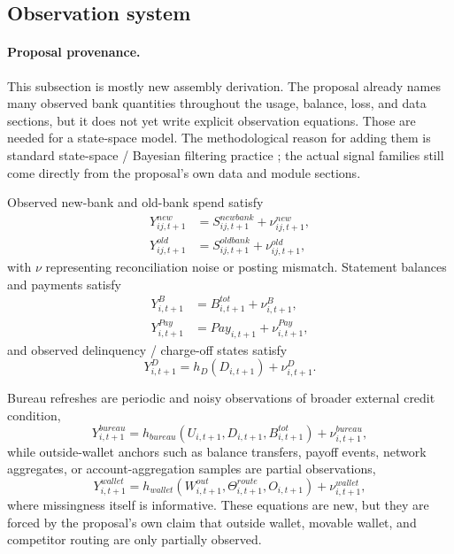 \documentclass[11pt]{article}
\newcommand{\1}{\mathbf{1}}
\begin{document}
\subsection{Observation system}
\label{subsec:state-space-observations}

\paragraph{Proposal provenance.}
This subsection is mostly new assembly derivation. The proposal already names
many observed bank quantities throughout the usage, balance, loss, and data
sections, but it does not yet write explicit observation equations. Those are
needed for a state-space model. The methodological reason for adding them is
standard state-space / Bayesian filtering practice
\citep{durbinkoopman2012ssm,westharrison1997bfdm,doucet2001smc}; the actual
signal families still come directly from the proposal's own data and module
sections.

Observed new-bank and old-bank spend satisfy
\begin{align}
  Y^{new}_{ij,t+1} &= S^{newbank}_{ij,t+1} + \nu^{new}_{ij,t+1},
    \label{eq:ss-obs-new}\\
  Y^{old}_{ij,t+1} &= S^{oldbank}_{ij,t+1} + \nu^{old}_{ij,t+1},
    \label{eq:ss-obs-old}
\end{align}
with $\nu$ representing reconciliation noise or posting mismatch.
Statement balances and payments satisfy
\begin{align}
  Y^B_{i,t+1} &= B^{tot}_{i,t+1} + \nu^B_{i,t+1},
    \label{eq:ss-obs-balance}\\
  Y^{Pay}_{i,t+1} &= Pay_{i,t+1} + \nu^{Pay}_{i,t+1},
    \label{eq:ss-obs-payment}
\end{align}
and observed delinquency / charge-off states satisfy
\begin{equation}
  Y^D_{i,t+1} = h_D(D_{i,t+1}) + \nu^{D}_{i,t+1}.
  \label{eq:ss-obs-delinquency}
\end{equation}

Bureau refreshes are periodic and noisy observations of broader external credit
condition,
\begin{equation}
  Y^{bureau}_{i,t+1}
  =
  h_{bureau}(U_{i,t+1},D_{i,t+1},B^{tot}_{i,t+1}) + \nu^{bureau}_{i,t+1},
  \label{eq:ss-obs-bureau}
\end{equation}
while outside-wallet anchors such as balance transfers, payoff events, network
aggregates, or account-aggregation samples are partial observations,
\begin{equation}
  Y^{wallet}_{i,t+1}
  =
  h_{wallet}(W^{out}_{i,t+1},\Theta^{route}_{i,t+1},O_{i,t+1})
  + \nu^{wallet}_{i,t+1},
  \label{eq:ss-obs-wallet}
\end{equation}
where missingness itself is informative. These equations are new, but they are
forced by the proposal's own claim that outside wallet, movable wallet, and
competitor routing are only partially observed.
\end{document}
